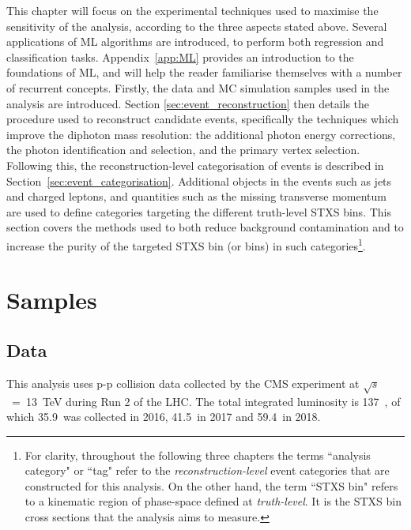 This chapter will focus on the experimental techniques used to maximise the sensitivity of the analysis, according to the three aspects stated above. Several applications of ML algorithms are introduced, to perform both regression and classification tasks. Appendix~\ref{app:ML} provides an introduction to the foundations of ML, and will help the reader familiarise themselves with a number of recurrent concepts. Firstly, the data and MC simulation samples used in the analysis are introduced. Section \ref{sec:event_reconstruction} then details the procedure used to reconstruct candidate \Hgg events, specifically the techniques which improve the diphoton mass resolution: the additional photon energy corrections, the photon identification and selection, and the primary vertex selection. Following this, the reconstruction-level categorisation of events is described in Section~\ref{sec:event_categorisation}. Additional objects in the events such as jets and charged leptons, and quantities such as the missing transverse momentum are used to define categories targeting the different truth-level STXS bins. This section covers the methods used to both reduce background contamination and to increase the purity of the targeted STXS bin (or bins) in such categories\footnote{For clarity, throughout the following three chapters the terms ``analysis category" or ``tag" refer to the \textit{reconstruction-level} event categories that are constructed for this analysis. On the other hand, the term ``STXS bin" refers to a kinematic region of phase-space defined at \textit{truth-level}. It is the STXS bin cross sections that the analysis aims to measure.}.


\section{Samples}
\subsection{Data}
This analysis uses p-p collision data collected by the CMS experiment at $\sqrt{s}$~=~13~TeV during Run 2 of the LHC. The total integrated luminosity is 137~\fbinv, of which 35.9~\fbinv was collected in 2016, 41.5~\fbinv in 2017 and 59.4~\fbinv in 2018.

